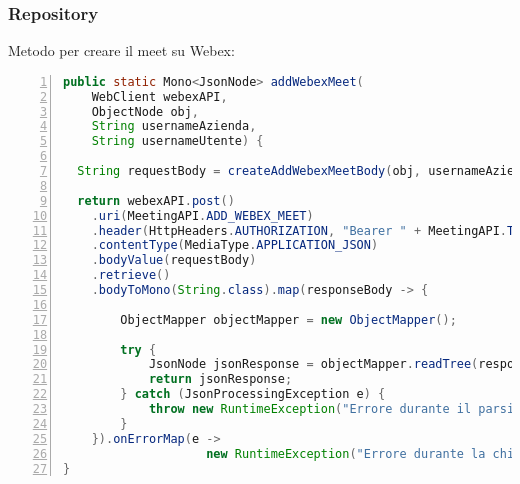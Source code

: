 \subsubsection{Repository}
Metodo per creare il meet su Webex:
\begin{lstlisting}[language=java, frame=lines, basicstyle=\ttfamily\scriptsize, numbers=left]
public static Mono<JsonNode> addWebexMeet(
    WebClient webexAPI, 
    ObjectNode obj, 
    String usernameAzienda,
    String usernameUtente) {

  String requestBody = createAddWebexMeetBody(obj, usernameAzienda, usernameUtente);

  return webexAPI.post()
    .uri(MeetingAPI.ADD_WEBEX_MEET)
    .header(HttpHeaders.AUTHORIZATION, "Bearer " + MeetingAPI.TOKEN)
    .contentType(MediaType.APPLICATION_JSON)
    .bodyValue(requestBody)
    .retrieve()
    .bodyToMono(String.class).map(responseBody -> {

        ObjectMapper objectMapper = new ObjectMapper();
            
        try {
            JsonNode jsonResponse = objectMapper.readTree(responseBody);
            return jsonResponse;
        } catch (JsonProcessingException e) {
            throw new RuntimeException("Errore durante il parsing della risposta JSON", e);
        }
    }).onErrorMap(e -> 
                    new RuntimeException("Errore durante la chiamata all'API di Webex", e));
}
\end{lstlisting}
